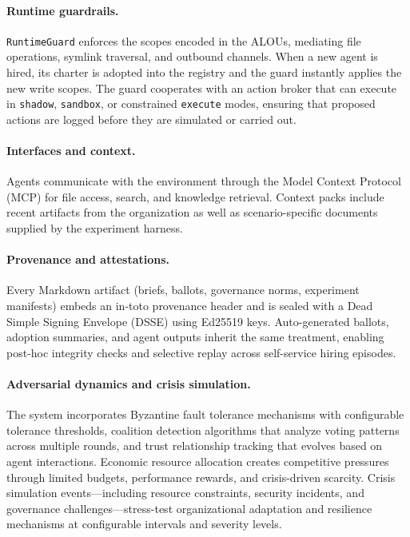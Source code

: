 \documentclass[11pt]{article}
\begin{document}
\paragraph{Runtime guardrails.} \texttt{RuntimeGuard} enforces the scopes encoded in the ALOUs, mediating file operations, symlink traversal, and outbound channels. When a new agent is hired, its charter is adopted into the registry and the guard instantly applies the new write scopes. The guard cooperates with an action broker that can execute in \texttt{shadow}, \texttt{sandbox}, or constrained \texttt{execute} modes, ensuring that proposed actions are logged before they are simulated or carried out.

\paragraph{Interfaces and context.} Agents communicate with the environment through the Model Context Protocol (MCP) for file access, search, and knowledge retrieval. Context packs include recent artifacts from the organization as well as scenario-specific documents supplied by the experiment harness.

\paragraph{Provenance and attestations.} Every Markdown artifact (briefs, ballots, governance norms, experiment manifests) embeds an in-toto provenance header and is sealed with a Dead Simple Signing Envelope (DSSE) using Ed25519 keys. Auto-generated ballots, adoption summaries, and agent outputs inherit the same treatment, enabling post-hoc integrity checks and selective replay across self-service hiring episodes.

\paragraph{Adversarial dynamics and crisis simulation.} The system incorporates Byzantine fault tolerance mechanisms with configurable tolerance thresholds, coalition detection algorithms that analyze voting patterns across multiple rounds, and trust relationship tracking that evolves based on agent interactions. Economic resource allocation creates competitive pressures through limited budgets, performance rewards, and crisis-driven scarcity. Crisis simulation events—including resource constraints, security incidents, and governance challenges—stress-test organizational adaptation and resilience mechanisms at configurable intervals and severity levels.
\end{document}

